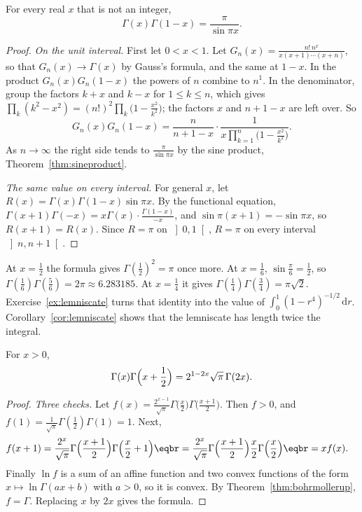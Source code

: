 \begin{theorem}\label{thm:reflection}
For every real $x$ that is not an integer,
\[
\Gamma(x)\Gamma(1-x)=\frac\pi{\sin\pi x}.
\]
\end{theorem}
\begin{proof}
\emph{On the unit interval.}
First let $0<x<1$. Let $G_n(x)=\frac{n!\,n^x}{x(x+1)\cdots(x+n)}$, so that $G_n(x)\to\Gamma(x)$ by Gauss's formula, and the same at $1-x$.
In the product $G_n(x)G_n(1-x)$ the powers of $n$ combine to $n^1$. In the denominator, group the factors $k+x$ and $k-x$ for
$1\le k\le n$, which gives $\prod_k(k^2-x^2)=(n!)^2\prod_k\bigl(1-\frac{x^2}{k^2}\bigr)$; the factors $x$ and $n+1-x$ are left over. So
\[
G_n(x)G_n(1-x)=\frac n{n+1-x}\cdot\frac1{x\prod_{k=1}^n\bigl(1-\frac{x^2}{k^2}\bigr)}.
\]
As $n\to\infty$ the right side tends to $\frac\pi{\sin\pi x}$ by the sine product, Theorem~\ref{thm:sineproduct}.

\emph{The same value on every interval.}
For general $x$, let $R(x)=\Gamma(x)\Gamma(1-x)\sin\pi x$. By the functional equation,
$\Gamma(x+1)\Gamma(-x)=x\Gamma(x)\cdot\frac{\Gamma(1-x)}{-x}$, and $\sin\pi(x+1)=-\sin\pi x$, so $R(x+1)=R(x)$. Since $R=\pi$ on $\left]0,1\right[$,
$R=\pi$ on every interval $\left]n,n+1\right[$.
\end{proof}

At $x=\frac12$ the formula gives $\Gamma(\frac12)^2=\pi$ once more. At $x=\frac16$, $\sin\frac\pi6=\frac12$, so $\Gamma(\frac16)\Gamma(\frac56)=2\pi\approx6.283185$. At $x=\frac14$ it gives $\Gamma(\frac14)\Gamma(\frac34)=\pi\sqrt2$. Exercise~\ref{ex:lemniscate} turns that identity into the value of $\int_0^1(1-r^4)^{-1/2}\,\mathrm dr$. Corollary~\ref{cor:lemniscate} shows that the lemniscate has length twice the integral.

\begin{theorem}\label{thm:duplication}
For $x>0$,
\[
\Gamma(x)\Gamma\Bigl(x+\frac12\Bigr)=2^{1-2x}\sqrt\pi\,\Gamma(2x).
\]
\end{theorem}
\begin{proof}
\emph{Three checks.}
Let $f(x)=\frac{2^{x-1}}{\sqrt\pi}\Gamma\bigl(\frac x2\bigr)\Gamma\bigl(\frac{x+1}2\bigr)$. Then $f>0$, and $f(1)=\frac1{\sqrt\pi}\Gamma(\frac12)\Gamma(1)=1$.
Next,
\[
\begin{aligned}f(x+1)&=\frac{2^x}{\sqrt\pi}\Gamma\Bigl(\frac{x+1}2\Bigr)\Gamma\Bigl(\frac x2+1\Bigr)\eqbr=\frac{2^x}{\sqrt\pi}\Gamma\Bigl(\frac{x+1}2\Bigr)\frac x2\Gamma\Bigl(\frac x2\Bigr)\eqbr=xf(x).\end{aligned}
\]
Finally $\ln f$ is a sum of an affine function and two convex functions of the form $x\mapsto\ln\Gamma(ax+b)$ with $a>0$, so
it is convex. By Theorem~\ref{thm:bohrmollerup}, $f=\Gamma$. Replacing $x$ by $2x$ gives the formula.
\end{proof}

